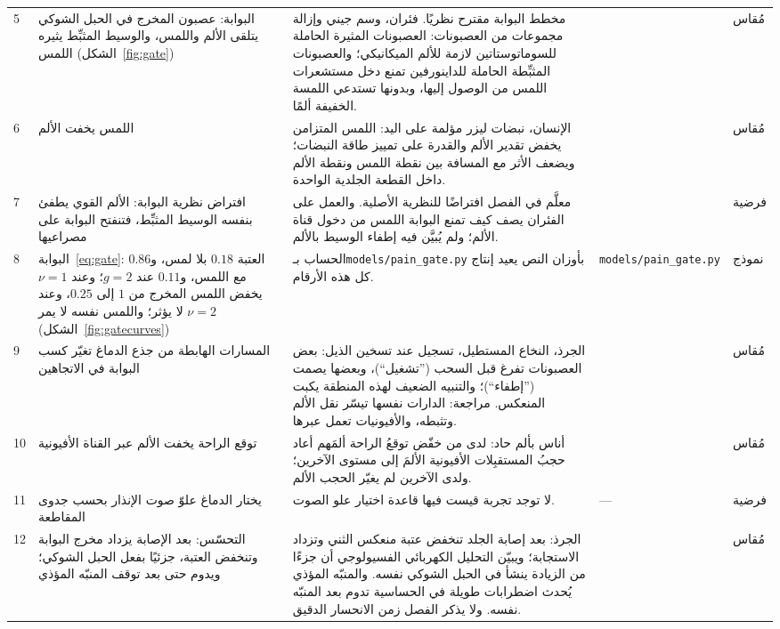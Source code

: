 {\begin{longtable}{>{\raggedright}p{0.5cm}>{\raggedright}p{4.0cm}>{\raggedright}p{5.6cm}>{\raggedright}p{2.3cm}>{\raggedright\arraybackslash}p{1.7cm}}
5 & البوابة: عصبون المخرج في الحبل الشوكي يتلقى الألم واللمس، والوسيط المثبِّط يثيره اللمس (الشكل~\ref{fig:gate}) & مخطط البوابة مقترح نظريًا. فئران، وسم جيني وإزالة مجموعات من العصبونات: العصبونات المثيرة الحاملة للسوماتوستاتين لازمة للألم الميكانيكي؛ والعصبونات المثبِّطة الحاملة للداينورفين تمنع دخل مستشعرات اللمس من الوصول إليها، وبدونها تستدعي اللمسة الخفيفة ألمًا. & \cite{MelzackWall1965, Duan2014} & مُقاس \\
6 & اللمس يخفت الألم & الإنسان، نبضات ليزر مؤلمة على اليد: اللمس المتزامن يخفض تقدير الألم والقدرة على تمييز طاقة النبضات؛ ويضعف الأثر مع المسافة بين نقطة اللمس ونقطة الألم داخل القطعة الجلدية الواحدة. & \cite{Mancini2014touch} & مُقاس \\
7 & افتراض نظرية البوابة: الألم القوي يطفئ بنفسه الوسيط المثبِّط، فتنفتح البوابة على مصراعيها & معلَّم في الفصل افتراضًا للنظرية الأصلية. والعمل على الفئران يصف كيف تمنع البوابة اللمس من دخول قناة الألم؛ ولم يُبيَّن فيه إطفاء الوسيط بالألم. & \cite{MelzackWall1965} & فرضية \\
8 & البوابة~\eqref{eq:gate}: العتبة $0.18$ بلا لمس، و$0.86$ مع اللمس، و$0.11$ عند $g=2$؛ وعند $\nu=1$ يخفض اللمس المخرج من $1$ إلى $0.25$، وعند $\nu=2$ لا يؤثر؛ واللمس نفسه لا يمر (الشكل~\ref{fig:gatecurves}) & الحساب بـ\foreignlanguage{english}{\texttt{models/\allowbreak pain\_\allowbreak gate.py}} بأوزان النص يعيد إنتاج كل هذه الأرقام. & \foreignlanguage{english}{\texttt{models/\allowbreak pain\_\allowbreak gate.py}} & نموذج \\
9 & المسارات الهابطة من جذع الدماغ تغيّر كسب البوابة في الاتجاهين & الجرذ، النخاع المستطيل، تسجيل عند تسخين الذيل: بعض العصبونات تفرغ قبل السحب (”تشغيل“)، وبعضها يصمت (”إطفاء“)؛ والتنبيه الضعيف لهذه المنطقة يكبت المنعكس. مراجعة: الدارات نفسها تيسّر نقل الألم وتثبطه، والأفيونيات تعمل عبرها. & \cite{Fields1983rvm, Fields2004} & مُقاس \\
10 & توقع الراحة يخفت الألم عبر القناة الأفيونية & أناس بألم حاد: لدى من خفّض توقعُ الراحة ألمَهم أعاد حجبُ المستقبِلات الأفيونية الألمَ إلى مستوى الآخرين؛ ولدى الآخرين لم يغيّر الحجب الألم. & \cite{Levine1978} & مُقاس \\
11 & يختار الدماغ علوّ صوت الإنذار بحسب جدوى المقاطعة & لا توجد تجربة قيست فيها قاعدة اختيار علو الصوت. & --- & فرضية \\
12 & التحسّس: بعد الإصابة يزداد مخرج البوابة وتنخفض العتبة، جزئيًا بفعل الحبل الشوكي؛ ويدوم حتى بعد توقف المنبّه المؤذي & الجرذ: بعد إصابة الجلد تنخفض عتبة منعكس الثني وتزداد الاستجابة؛ ويبيّن التحليل الكهربائي الفسيولوجي أن جزءًا من الزيادة ينشأ في الحبل الشوكي نفسه. والمنبّه المؤذي يُحدث اضطرابات طويلة في الحساسية تدوم بعد المنبّه نفسه. ولا يذكر الفصل زمن الانحسار الدقيق. & \cite{Woolf1983} & مُقاس \\

\end{longtable}}

